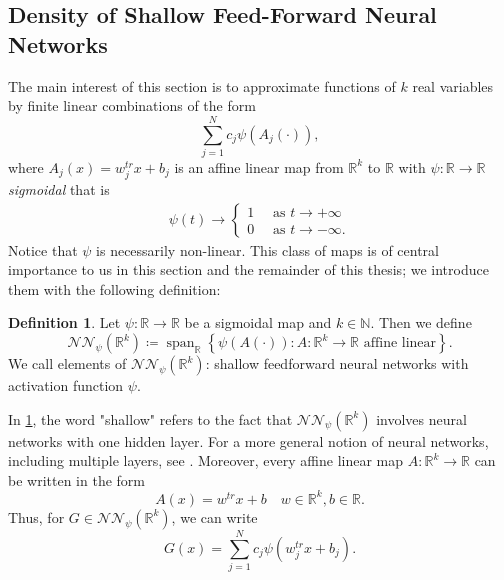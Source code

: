 \documentclass[11pt,a4paper,twoside,openany]{report}
\theoremstyle{plain} %
\theoremstyle{definition} %
\newtheorem{definition}[definition]{Definition}
\theoremstyle{remark} %
\let\parencite\authnumparencite
\begin{document}
\subsection{Density of Shallow Feed-Forward Neural Networks}
The main interest of this section is to approximate functions of \(k\) real variables by finite linear combinations of the form 
\begin{equation}
    \sum_{j=1}^Nc_j\psi(A_j(\cdot)),
\end{equation}
where \(A_j(x)=w_j^{tr}x+b_j\) is an affine linear map from \(\mathbb{R}^k\) to \(\mathbb{R}\) with \(\psi:\mathbb{R}\to\mathbb{R}\) \textit{sigmoidal} that is
\begin{align*}
\psi(t)\to
    \begin{cases}
    1\quad\text{ as } t\to +\infty\\
    0\quad\text{ as } t\to -\infty.
    \end{cases}
\end{align*}
Notice that \(\psi\) is necessarily non-linear. 
This class of maps is of central importance to us in this section and the remainder of this thesis; we introduce them with the following definition:
\begin{definition}\label{def:shallow feedforward neural networks}
    Let \(\psi:\mathbb{R}\to\mathbb{R}\) be a sigmoidal map and \(k\in\mathbb{N}\). Then we define
    \begin{equation}
        \mathcal{NN}_{\psi}(\mathbb{R}^k)\coloneqq\operatorname{span}_{\mathbb{R}}\left\{\psi(A(\cdot)):A:\mathbb{R}^k\to\mathbb{R}\text{ affine linear}\right\}.
    \end{equation}
    We call elements of \(\mathcal{NN}_{\psi}(\mathbb{R}^k)\): shallow feedforward neural networks with activation function \(\psi\).
\end{definition}
In \cref{def:shallow feedforward neural networks}, the word "shallow" refers to the fact that \(\mathcal{NN}_{\psi}(\mathbb{R}^k)\) involves neural networks with one hidden layer. 
For a more general notion of neural networks, including multiple layers, see \parencite[Def.~4.1]{Buehler2018DeepHedging}.
Moreover, every affine linear map \(A:\mathbb{R}^k\to\mathbb{R}\) can be written in the form 
\begin{equation}
    A(x)=w^{tr}x+b\quad w\in\mathbb{R}^k,b\in\mathbb{R}.
\end{equation}
Thus, for \(G\in \mathcal{NN}_{\psi}(\mathbb{R}^k)\), we can write
\begin{equation}
    G(x)=\sum_{j=1}^Nc_j\psi(w_j^{tr}x+b_j).
\end{equation}
\end{document}
